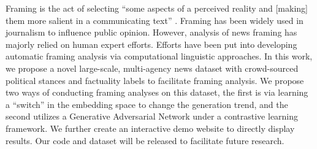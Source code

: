 Framing is the act of selecting ``some aspects of a perceived reality and [making] them more salient in a communicating text'' \cite{entman1993}. Framing has been widely used in journalism to influence public opinion. However, analysis of news framing has majorly relied on human expert efforts. Efforts have been put into developing automatic framing analysis via computational linguistic approaches. In this work, we propose a novel large-scale, multi-agency news dataset with crowd-sourced political stances and factuality labels to facilitate framing analysis. We propose two ways of conducting framing analyses on this dataset, the first is via learning a ``switch'' in the embedding space to change the generation trend, and the second utilizes a Generative Adversarial Network under a contrastive learning framework. We further create an interactive demo website to directly display results. Our code and dataset will be released to facilitate future research.